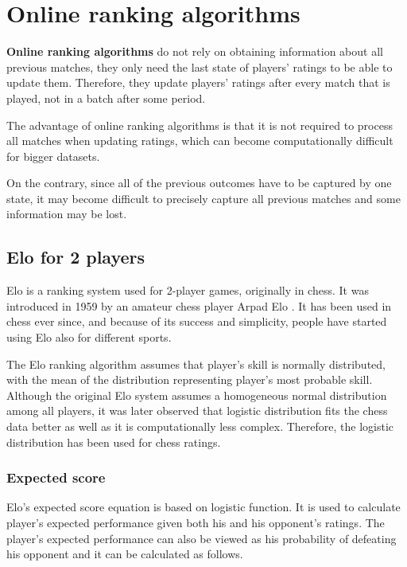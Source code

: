 \chapter{Online ranking algorithms}
\label{ch:online_ranking}
\textbf{Online ranking algorithms} do not rely on obtaining information about all previous matches, they only need the last state of players' ratings to be able to update them. Therefore, they update players' ratings after every match that is played, not in a batch after some period.
 
The advantage of online ranking algorithms is that it is not required to process all matches when updating ratings, which can become computationally difficult for bigger datasets.

On the contrary, since all of the previous outcomes have to be captured by one state, it may become difficult to precisely capture all previous matches and some information may be lost.

\section{Elo for 2 players}
\label{ch:elo_for_two_players}
Elo is a ranking system used for 2-player games, originally in chess. It was introduced in 1959 by an amateur chess player Arpad Elo \citep{Eloratingchessplayerspresent1978}. It has been used in chess ever since, and because of its success and simplicity, people have started using Elo also for different sports.

The Elo ranking algorithm assumes that player's skill is normally distributed, with the mean of the distribution representing player's most probable skill. Although the original Elo system assumes a homogeneous normal distribution among all players, it was later observed that logistic distribution fits the chess data better \citep{ReganUnderstandingDistributionsChess2011} as well as it is computationally less complex. Therefore, the logistic distribution has been used for chess ratings.

\subsection{Expected score}
\label{sec:expected_score}
Elo's expected score equation is based on logistic function. It is used to calculate player's expected performance given both his and his opponent's ratings. The player's expected performance can also be viewed as his probability of defeating his opponent and it can be calculated as follows.

